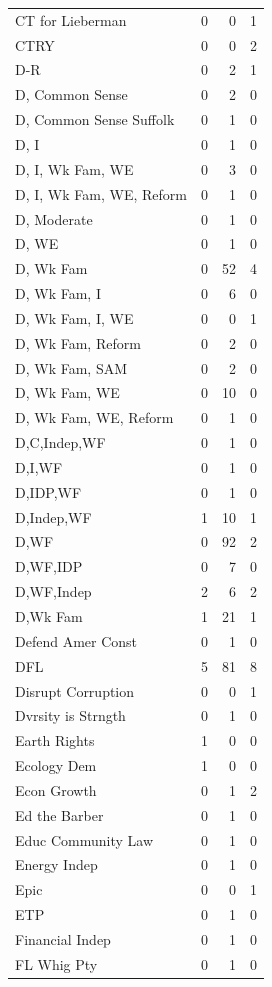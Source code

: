 \begin{supertabular}{lrrr}
CT for Lieberman & 0 & 0 & 1\\
CTRY & 0 & 0 & 2\\
D-R & 0 & 2 & 1\\
D, Common Sense & 0 & 2 & 0\\
D, Common Sense Suffolk & 0 & 1 & 0\\
D, I & 0 & 1 & 0\\
D, I, Wk Fam, WE & 0 & 3 & 0\\
D, I, Wk Fam, WE, Reform & 0 & 1 & 0\\
D, Moderate & 0 & 1 & 0\\
D, WE & 0 & 1 & 0\\
D, Wk Fam & 0 & 52 & 4\\
D, Wk Fam, I & 0 & 6 & 0\\
D, Wk Fam, I, WE & 0 & 0 & 1\\
D, Wk Fam, Reform & 0 & 2 & 0\\
D, Wk Fam, SAM & 0 & 2 & 0\\
D, Wk Fam, WE & 0 & 10 & 0\\
D, Wk Fam, WE, Reform & 0 & 1 & 0\\
D,C,Indep,WF & 0 & 1 & 0\\
D,I,WF & 0 & 1 & 0\\
D,IDP,WF & 0 & 1 & 0\\
D,Indep,WF & 1 & 10 & 1\\
D,WF & 0 & 92 & 2\\
D,WF,IDP & 0 & 7 & 0\\
D,WF,Indep & 2 & 6 & 2\\
D,Wk Fam & 1 & 21 & 1\\
Defend Amer Const & 0 & 1 & 0\\
DFL & 5 & 81 & 8\\
Disrupt Corruption & 0 & 0 & 1\\
Dvrsity is Strngth & 0 & 1 & 0\\
Earth Rights & 1 & 0 & 0\\
Ecology Dem & 1 & 0 & 0\\
Econ Growth & 0 & 1 & 2\\
Ed the Barber & 0 & 1 & 0\\
Educ Community Law & 0 & 1 & 0\\
Energy Indep & 0 & 1 & 0\\
Epic & 0 & 0 & 1\\
ETP & 0 & 1 & 0\\
Financial Indep & 0 & 1 & 0\\
FL Whig Pty & 0 & 1 & 0\\

\end{supertabular}
